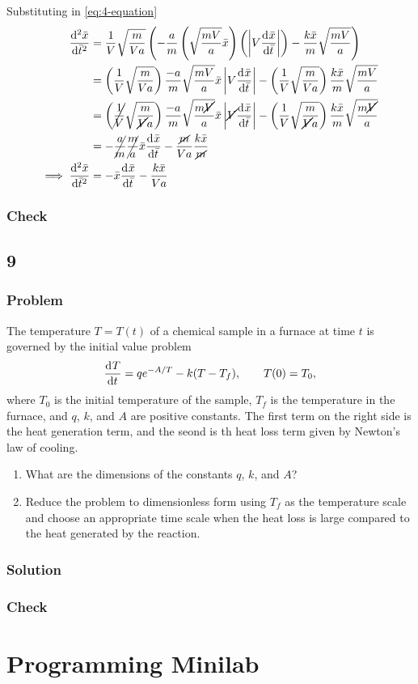 \documentclass[12pt]{article}
\begin{document}
Substituting in \cref{eq:4-equation}
\begin{equation}
  \begin{aligned}
    \od[2]{\bar{x}}{\bar{t}} &= \frac{1}{V}\sqrt{\frac{m}{Va}} \left(
    -\frac{a}{m}\left( \sqrt{\frac{mV}{a}}\bar{x}\right) \left(
    \abs{V\od{\bar{x}}{\bar{t}}}\right) -
    \frac{k\bar{x}}{m}\sqrt{\frac{mV}{a}}\right) \\
    &= \left(\frac{1}{V}\sqrt{\frac{m}{Va}}\right)\frac{-a}{m}\sqrt{\frac{mV}{a}}\bar{x}
    \abs{V\od{\bar{x}}{\bar{t}}} -
    \left(\frac{1}{V}\sqrt{\frac{m}{Va}}\right)\frac{k\bar{x}}{m}\sqrt{\frac{mV}{a}} \\
    &= \left(\cancel{\frac{1}{V}}\sqrt{\frac{m}{\cancel{V}a}}\right)\frac{-a}{m}\sqrt{\frac{m\cancel{V}}{a}}\bar{x}
    \abs{\cancel{V}\od{\bar{x}}{\bar{t}}} -
    \left(\frac{1}{V}\sqrt{\frac{m}{\cancel{V}a}}\right)\frac{k\bar{x}}{m}\sqrt{\frac{m\cancel{V}}{a}} \\
    &= -\cancel{\frac{a}{m}}\cancel{\frac{m}{a}}\bar{x}\od{\bar{x}}{\bar{t}} -
    \frac{\cancel{m}}{Va}\frac{k\bar{x}}{\cancel{m}} \\
    \implies \od[2]{\bar{x}}{\bar{t}} &= -\bar{x}\od{\bar{x}}{\bar{t}} - \frac{k\bar{x}}{Va} \\
  \end{aligned}
\end{equation}

\subsubsection*{Check}
\todo

\subsection{9}
\subsubsection*{Problem}

The temperature $T=T(t)$ of a chemical sample in a furnace at time $t$ is
governed by the initial value problem
$$\od{T}{t}=qe^{-A/T}-k(T-T_f),\qquad T(0)=T_0,$$ where $T_0$ is the initial
temperature of the sample, $T_f$ is the temperature in the furnace, and $q$,
$k$, and $A$ are positive constants. The first term on the right side is the
heat generation term, and the seond is th heat loss term given by Newton's law
of cooling.
\begin{enumerate}
\item What are the dimensions of the constants $q$, $k$, and $A$?
\item Reduce the problem to dimensionless form using $T_f$ as the temperature
  scale and choose an appropriate time scale when the heat loss is large
  compared to the heat generated by the reaction.
\end{enumerate}

\subsubsection*{Solution}
\todo
\subsubsection*{Check}
\todo

\section{Programming Minilab}
\todo
\end{document}
